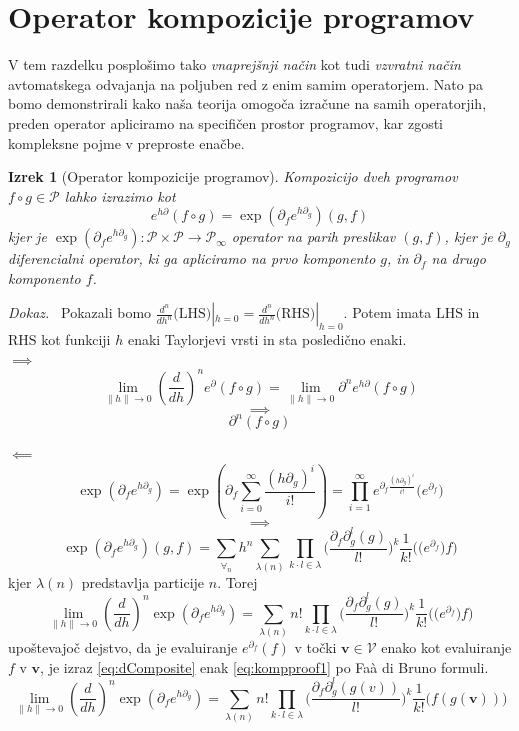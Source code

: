 \documentclass[a4paper, 12pt]{book}
\newcommand{\VV}{\mathcal{V}}
\newcommand{\vv}{\mathbf{v}}
\newcommand{\dP}{\mathcal{P}}
\newcommand{\D}{\partial}
\newtheorem{izrek}{Izrek}[chapter]
\newenvironment{dokaz}{\emph{Dokaz.}\ }{\hspace{\fill}{$\Box$}}
\begin{document}
\section{Operator kompozicije programov}\label{sec:OpKompo}

V tem razdelku posplošimo tako \emph{vnaprejšnji način} \cite{PcAD} kot tudi \emph{vzvratni način} \cite{ReverseAD} avtomatskega odvajanja na poljuben red z enim samim operatorjem. Nato pa bomo demonstrirali kako naša teorija omogoča izračune na samih operatorjih, preden operator apliciramo na specifičen prostor programov, kar zgosti kompleksne pojme v preproste enačbe.

 \begin{izrek}[Operator kompozicije programov]\label{izr:kompo}
 Kompozicijo dveh programov $f\circ g\in\dP$ lahko izrazimo kot
 \begin{equation}\label{eq:kompo}
 e^{h\D}(f\circ g)=\exp(\D_fe^{h\D_g})(g,f)
 \end{equation}
 kjer je $\exp(\D_fe^{h\D_g}):\dP\times\dP\to\dP_\infty$ operator na parih preslikav $(g,f)$, kjer je $\D_g$ diferencialni operator, ki ga apliciramo na prvo komponento $g$, in $\D_f$ na drugo komponento $f$. 
 \end{izrek}
\begin{dokaz}
  Pokazali bomo $\frac{d^n}{dh^n}\text{(LHS)}|_{h=0}=\frac{d^n}{dh^n}\text{(RHS)}|_{h=0}$. Potem imata $\text{LHS}$ in $\text{RHS}$ kot funkciji $h$ enaki Taylorjevi vrsti in sta posledično enaki.\\
 $\implies$
 $$\lim\limits_{\lVert h\rVert\to 0}(\frac{d}{dh})^ne^\D(f\circ g)=\lim\limits_{\lVert h\rVert\to 0}\D^ne^{h\D}(f\circ g)$$
 $$\implies$$
 \begin{equation}\label{eq:kompproof1}
 \D^n(f\circ g)
 \end{equation}
 
 $\impliedby$
 $$\exp(\D_fe^{h\D_g})=\exp\left(\D_f\sum\limits_{i=0}^{\infty}\frac{(h\D_g)^i}{i!}\right)=\prod_{i=1}^{\infty}e^{\D_f\frac{(h\D_g)^i}{i!}}\Big(e^{\D_f}\Big)$$
 $$\implies$$
 $$\exp(\D_fe^{h\D_g})(g,f)=\sum\limits_{\forall_n}h^n\sum\limits_{\lambda(n)}\prod\limits_{k\cdot l\in\lambda}\Big(\frac{\D_f\D_g^l(g)}{l!}\Big)^k\frac{1}{k!}\Big(\Big(e^{\D_f}\Big)f\Big)$$
 kjer $\lambda(n)$ predstavlja particije $n$. Torej
 \begin{equation}\label{eq:dComposite}
 \lim\limits_{\lVert h\rVert\to 0}(\frac{d}{dh})^n\exp(\D_fe^{h\D_g})=\sum\limits_{\lambda(n)}n!\prod\limits_{k\cdot l\in\lambda}\Big(\frac{\D_f\D_g^l(g)}{l!}\Big)^k\frac{1}{k!}\Big(\Big(e^{\D_f}\Big)f\Big)
 \end{equation}
 upoštevajoč dejstvo, da je evaluiranje $e^{\D_f}(f)$ v točki $\vv\in \VV$ enako kot evaluiranje $f$ v $\vv$, je izraz \eqref{eq:dComposite} enak \eqref{eq:kompproof1} po Faà di Bruno formuli.
   \begin{equation}\label{eq:dCompositePoint}
   \lim\limits_{\lVert h\rVert\to 0}(\frac{d}{dh})^n\exp(\D_fe^{h\D_g})=\sum\limits_{\lambda(n)}n!\prod\limits_{k\cdot l\in\lambda}\Big(\frac{\D_f\D_g^l(g(v))}{l!}\Big)^k\frac{1}{k!}\Big(f(g(\vv))\Big)
   \end{equation}
 \end{dokaz}  
 
\end{document}
